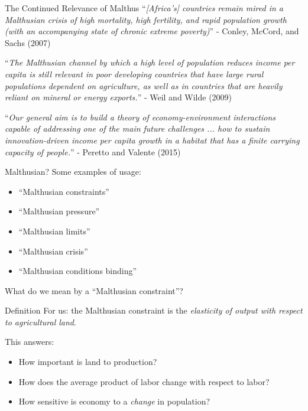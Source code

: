 \documentclass[10pt, xcolor=dvipsnames]{beamer}
\begin{document}
\begin{frame}{The Continued Relevance of Malthus}
``\textit{[Africa's] countries remain mired in a Malthusian crisis of high mortality, high fertility, and rapid population growth (with an accompanying state of chronic extreme poverty)}'' - Conley, McCord, and Sachs (2007)

\vspace{.5cm}
``\textit{The Malthusian channel by which a high level of population reduces income per capita is still relevant in poor developing countries that have large rural populations dependent on agriculture, as well as in countries that are heavily reliant on mineral or energy exports.}'' - Weil and Wilde (2009)

\vspace{.5cm}
``\textit{Our general aim is to build a theory of economy-environment interactions capable of addressing one of the main future challenges ... how to sustain innovation-driven income per capita growth in a habitat that has a finite carrying capacity of people.}'' - Peretto and Valente (2015)
\end{frame}


\begin{frame}{Malthusian?}
Some examples of usage:
\begin{itemize}
\item ``Malthusian constraints''
\item ``Malthusian pressure''
\item ``Malthusian limits''
\item ``Malthusian crisis''
\item ``Malthusian conditions binding''
\end{itemize}

\vspace{.5cm} What do we mean by a ``Malthusian constraint''? 
\end{frame}

\begin{frame}{Definition}\label{define}
For us: the Malthusian constraint is the \textit{elasticity of output with respect to agricultural land}. 

\vspace{.2cm} This answers:
\begin{itemize}
\item How important is land to production?
\item How does the average product of labor change with respect to labor?
\item How sensitive is economy to a \textit{change} in population?
\end{itemize}

\hfill \hyperlink{toy}{}
\end{frame}
\end{document}
